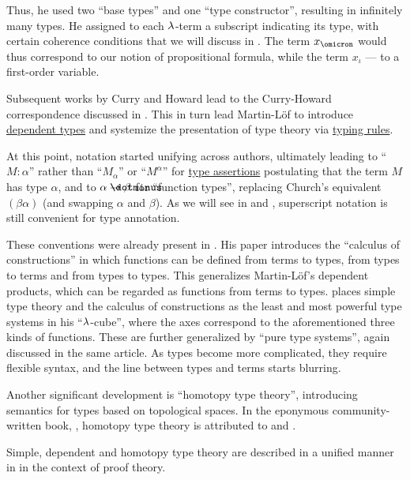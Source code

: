 \begin{remark}
  Thus, he used two \enquote{base types} and one \enquote{type constructor}, resulting in infinitely many types. He assigned to each \( \mathrm{\lambda} \)-term a subscript indicating its type, with certain coherence conditions that we will discuss in . The term \( x_\omicron \) would thus correspond to our notion of propositional formula, while the term \( x_\iota \) --- to a first-order variable.

  Subsequent works by Curry and Howard lead to the Curry-Howard correspondence discussed in . This in turn lead Martin-Löf to introduce \hyperref[rem:dependent_type]{dependent types} and systemize the presentation of type theory via \hyperref[def:typing_rule]{typing rules}.

  At this point, notation started unifying across authors, ultimately leading to \enquote{\( M: \alpha \)} rather than \enquote{\( M_\alpha \)} or \enquote{\( M^\alpha \)} for \hyperref[def:type_assertion]{type assertions} postulating that the term \( M \) has type \( \alpha \), and to \( \alpha \synimplies \beta \) for \enquote{function types}, replacing Church's equivalent \( (\beta\alpha) \) (and swapping \( \alpha \) and \( \beta \)). As we will see in  and , superscript notation is still convenient for type annotation.

  These conventions were already present in . His paper introduces the \enquote{calculus of constructions} in which functions can be defined from terms to types, from types to terms and from types to types. This generalizes Martin-L\"of's dependent products, which can be regarded as functions from terms to types.  places simple type theory and the calculus of constructions as the least and most powerful type systems in his \enquote{\( \mathrm{\lambda} \)-cube}, where the axes correspond to the aforementioned three kinds of functions. These are further generalized by \enquote{pure type systems}, again discussed in the same article. As types become more complicated, they require flexible syntax, and the line between types and terms starts blurring.

  Another significant development is \enquote{homotopy type theory}, introducing semantics for types based on topological spaces. In the eponymous community-written book, \cite{UnivalentProject2024OctoberHoTT}, homotopy type theory is attributed to \cite{Voevodski2006HoTT} and \cite{AwodeyWarren2009HoTT}.

  Simple, dependent and homotopy type theory are described in a unified manner in \cite{Mimram2020Types} in the context of proof theory.
\end{remark}

